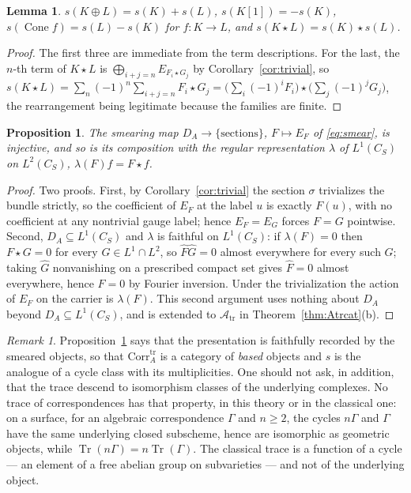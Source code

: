 \documentclass[11pt]{amsart}
\newtheorem{proposition}[theorem]{Proposition}
\newtheorem{lemma}[theorem]{Lemma}
\theoremstyle{definition}
\theoremstyle{remark}
\newtheorem{remark}[theorem]{Remark}
\newcommand{\Tr}{\operatorname{Tr}}
\newcommand{\Cone}{\operatorname{Cone}}
\newcommand{\DA}{D_A}
\newcommand{\Atr}{\mathcal A_{\mathrm{tr}}}
\newcommand{\Corrtr}{\mathrm{Corr}^{\mathrm{tr}}_{A}}
\begin{document}
\begin{lemma}\label{lem:slaws}
$s(K\oplus L)=s(K)+s(L)$, $s(K[1])=-s(K)$, $s(\Cone f)=s(L)-s(K)$ for
$f:K\to L$, and $s(K\star L)=s(K)\star s(L)$.
\end{lemma}

\begin{proof}
The first three are immediate from the term descriptions.  For the last, the
$n$-th term of $K\star L$ is $\bigoplus_{i+j=n}E_{F_i\star G_j}$ by
Corollary~\ref{cor:trivial}, so
$s(K\star L)=\sum_n(-1)^{n}\sum_{i+j=n}F_i\star G_j=
\bigl(\sum_i(-1)^{i}F_i\bigr)\star\bigl(\sum_j(-1)^{j}G_j\bigr)$, the
rearrangement being legitimate because the families are finite.
\end{proof}

\begin{proposition}\label{prop:faithful}
The smearing map $\DA\to\{\text{sections}\}$, $F\mapsto E_F$ of
\eqref{eq:smear}, is injective, and so is its composition with the regular
representation $\lambda$ of $L^{1}(C_S)$ on $L^{2}(C_S)$, $\lambda(F)f=F\star
f$.
\end{proposition}

\begin{proof}
Two proofs.  First, by Corollary~\ref{cor:trivial} the section $\sigma$
trivializes the bundle strictly, so the coefficient of $E_F$ at the label $u$
is exactly $F(u)$, with no coefficient at any nontrivial gauge label; hence
$E_F=E_G$ forces $F=G$ pointwise.  Second, $\DA\subseteq L^{1}(C_S)$ and
$\lambda$ is faithful on $L^{1}(C_S)$: if $\lambda(F)=0$ then $F\star G=0$ for
every $G\in L^{1}\cap L^{2}$, so $\widehat F\widehat G=0$ almost everywhere for
every such $G$; taking $\widehat G$ nonvanishing on a prescribed compact set
gives $\widehat F=0$ almost everywhere, hence $F=0$ by Fourier inversion.
Under the trivialization the action of $E_F$ on the carrier is $\lambda(F)$.
This second argument uses nothing about $\DA$ beyond $\DA\subseteq L^{1}(C_S)$,
and is extended to $\Atr$ in Theorem~\ref{thm:Atrcat}(b).
\end{proof}

\begin{remark}\label{rem:cycles}
Proposition~\ref{prop:faithful} says that the presentation is faithfully
recorded by the smeared objects, so that $\Corrtr$ is a category of
\emph{based} objects and $s$ is the analogue of a cycle class with its
multiplicities.  One should not ask, in addition, that the trace descend to
isomorphism classes of the underlying complexes.  No trace of correspondences
has that property, in this theory or in the classical one: on a surface, for
an algebraic correspondence $\Gamma$ and $n\ge2$, the cycles $n\Gamma$ and
$\Gamma$ have the same underlying closed subscheme, hence are isomorphic as
geometric objects, while $\Tr(n\Gamma)=n\Tr(\Gamma)$.  The classical trace is a
function of a cycle --- an element of a free abelian group on subvarieties ---
and not of the underlying object.
\end{remark}
\end{document}
